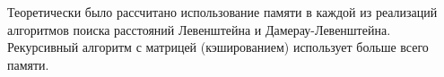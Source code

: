 \documentclass[12pt]{report}
\begin{document}
    Теоретически было рассчитано использование памяти в каждой из реализаций алгоритмов поиска
    расстояний Левенштейна и Дамерау-Левенштейна. Рекурсивный алгоритм с матрицей (кэшированием)
    использует больше всего памяти.

    \newpage

\end{document}
